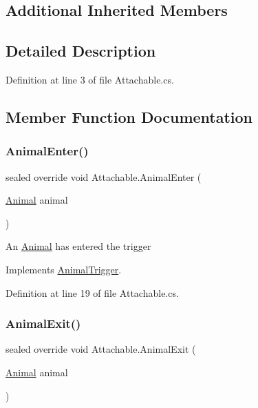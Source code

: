 \subsection*{Additional Inherited Members}


\subsection{Detailed Description}


Definition at line 3 of file Attachable.\+cs.



\subsection{Member Function Documentation}
\mbox{\label{class_attachable_a78b678ddd2860e245fd1ce5350414b8e}} 
\subsubsection{\texorpdfstring{Animal\+Enter()}{AnimalEnter()}}
{\footnotesize\ttfamily sealed override void Attachable.\+Animal\+Enter (\begin{DoxyParamCaption}\item[{\mbox{\hyperlink{class_animal}{Animal}}}]{animal }\end{DoxyParamCaption})\hspace{0.3cm}{\ttfamily [virtual]}}



An \mbox{\hyperlink{class_animal}{Animal}} has entered the trigger 



Implements \mbox{\hyperlink{class_animal_trigger_a03181803fa268e0bfcbdc752ee733c40}{Animal\+Trigger}}.



Definition at line 19 of file Attachable.\+cs.

\mbox{\label{class_attachable_adef6aa1287071d15d2724de7c0badbd8}} 
\subsubsection{\texorpdfstring{Animal\+Exit()}{AnimalExit()}}
{\footnotesize\ttfamily sealed override void Attachable.\+Animal\+Exit (\begin{DoxyParamCaption}\item[{\mbox{\hyperlink{class_animal}{Animal}}}]{animal }\end{DoxyParamCaption})\hspace{0.3cm}{\ttfamily [virtual]}}



